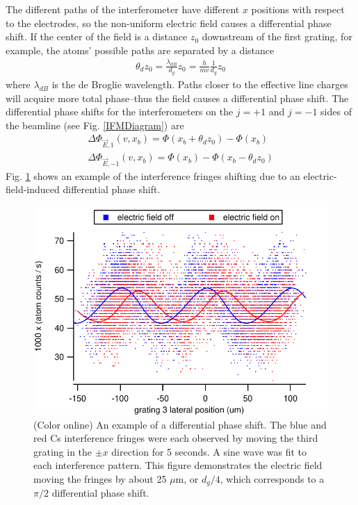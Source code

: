 \documentclass[twocolumn,prl,showpacs,superscriptaddress]{revtex4-1}   %
\newcommand{\figref}[1]{Fig. \ref{#1}}
\begin{document}
The different paths of the interferometer have different $x$ positions with respect to the electrodes, so the non-uniform electric field causes a differential phase shift. If the center of the field is a distance $z_0$ downstream of the first grating, for example, the atoms' possible paths are separated by a distance 
\begin{align}
	\theta_d z_0 = \frac{\lambda_{dB}}{d_g} z_0 = \frac{h}{mv}\frac{1}{d_g} z_0
	\label{pathSeparation}
\end{align}
where $\lambda_{dB}$ is the de Broglie wavelength. Paths closer to the effective line charges will acquire more total phase--thus the field causes a differential phase shift. The differential phase shifts for the interferometers on the $j=+1$ and $j=-1$ sides of the beamline (see \figref{IFMDiagram}) are
\begin{align}
	\Delta\Phi_{\vec{E},1}(v,x_b) = \Phi(x_b+\theta_d z_0) - \Phi(x_b) \nonumber \\
	\Delta\Phi_{\vec{E},-1}(v,x_b) = \Phi(x_b) - \Phi(x_b-\theta_d z_0)
	\label{deltaPhasePillars}
\end{align}
\figref{phaseShiftExample} shows an example of the interference fringes shifting due to an electric-field-induced differential phase shift.

\begin{figure}
\includegraphics[width=\linewidth,keepaspectratio]{countsVsGratingPos_150420.pdf}
\caption{\label{phaseShiftExample}(Color online) An example of a differential phase shift. The blue and red Cs interference fringes were each observed by moving the third grating in the $\pm x$ direction for 5 seconds. A sine wave was fit to each interference pattern. This figure demonstrates the electric field moving the fringes by about 25 $\mu$m, or $d_g/4$, which corresponds to a $\pi/2$ differential phase shift.}
\end{figure}
\end{document}
